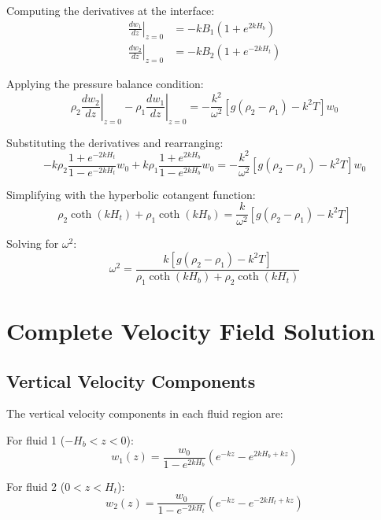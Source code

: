 \documentclass[12pt,a4paper]{article}
\begin{document}
Computing the derivatives at the interface:
\begin{align}
\left.\frac{dw_1}{dz}\right|_{z=0} &= -kB_1(1 + e^{2kH_b}) \\
\left.\frac{dw_2}{dz}\right|_{z=0} &= -kB_2(1 + e^{-2kH_t})
\end{align}

Applying the pressure balance condition:
\begin{equation}
\rho_2\left.\frac{dw_2}{dz}\right|_{z=0} - \rho_1\left.\frac{dw_1}{dz}\right|_{z=0} = -\frac{k^2}{\omega^2}[g(\rho_2 - \rho_1) - k^2T]w_0
\end{equation}

Substituting the derivatives and rearranging:
\begin{equation}
-k\rho_2\frac{1 + e^{-2kH_t}}{1 - e^{-2kH_t}}w_0 + k\rho_1\frac{1 + e^{2kH_b}}{1 - e^{2kH_b}}w_0 = -\frac{k^2}{\omega^2}[g(\rho_2 - \rho_1) - k^2T]w_0
\end{equation}

Simplifying with the hyperbolic cotangent function:
\begin{equation}
\rho_2\coth(kH_t) + \rho_1\coth(kH_b) = \frac{k}{\omega^2}[g(\rho_2 - \rho_1) - k^2T]
\end{equation}

Solving for $\omega^2$:
\begin{equation}
\omega^2 = \frac{k[g(\rho_2 - \rho_1) - k^2T]}{\rho_1\coth(kH_b) + \rho_2\coth(kH_t)}
\end{equation}

\section{Complete Velocity Field Solution}
\subsection{Vertical Velocity Components}
The vertical velocity components in each fluid region are:

For fluid 1 ($-H_b < z < 0$):
\begin{equation}
w_1(z) = \frac{w_0}{1 - e^{2kH_b}}(e^{-kz} - e^{2kH_b+kz})
\end{equation}

For fluid 2 ($0 < z < H_t$):
\begin{equation}
w_2(z) = \frac{w_0}{1 - e^{-2kH_t}}(e^{-kz} - e^{-2kH_t+kz})
\end{equation}
\end{document}
